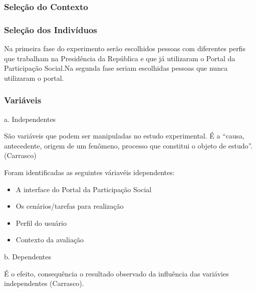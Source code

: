 
\subsubsection{Seleção do Contexto}

\subsubsection{Seleção dos Indivíduos}

	Na primeira fase do experimento serão escolhidos pessoas com diferentes perfis que trabalham na Presidência da República e que já utilizaram o Portal da Participação Social.Na segunda fase seriam escolhidas pessoas que nunca utilizaram o portal.

\subsubsection{Variáveis}
 
a. Independentes

São variáveis que podem ser manipuladas no estudo experimental. É a “causa, antecedente, origem de um fenômeno, processo que constitui o objeto de estudo”.(Carrasco)

Foram identificadas as seguintes váriavéis idependentes: 

\begin{itemize}
	\item A interface do Portal da Participação Social
	\item Os cenários/tarefas para realização
	\item Perfil do usuário
	\item Contexto da avaliação
\end{itemize}

b. Dependentes

É o efeito, consequência o resultado observado da influência das variávies independentes (Carrasco).


